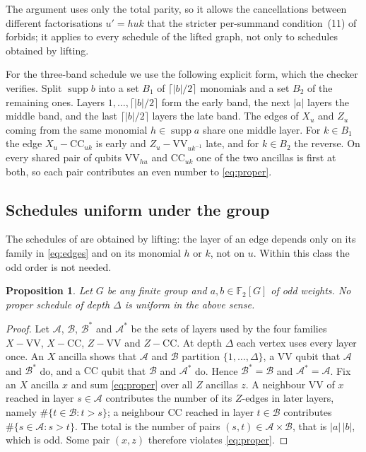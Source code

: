 \documentclass[11pt,a4paper]{article}
\newtheorem{proposition}[theorem]{Proposition}
\theoremstyle{definition}
\theoremstyle{plain}
\newcommand{\F}{\mathbb{F}_2}
\newcommand{\supp}{\operatorname{supp}}
\newcommand{\VV}{\mathrm{VV}}
\newcommand{\CC}{\mathrm{CC}}
\begin{document}
The argument uses only the total parity, so it allows the cancellations
between different factorisations $u'=huk$ that the stricter per-summand
condition~(11) of \cite{NRB2026} forbids; it applies to every schedule of the
lifted graph, not only to schedules obtained by lifting.

For the three-band schedule we use the following explicit form, which the
checker verifies. Split $\supp b$ into a set $B_1$ of $\lceil\lvert b\rvert/2\rceil$
monomials and a set $B_2$ of the remaining ones. Layers
$1,\dots,\lceil\lvert b\rvert/2\rceil$ form the early band, the next
$\lvert a\rvert$ layers the middle band, and the last
$\lceil\lvert b\rvert/2\rceil$ layers the late band. The edges of $X_u$ and $Z_u$
coming from the same monomial $h\in\supp a$ share one middle layer. For
$k\in B_1$ the edge $X_u-\CC_{uk}$ is early and $Z_u-\VV_{uk^{-1}}$ late, and for
$k\in B_2$ the reverse. On every shared pair of qubits $\VV_{hu}$ and
$\CC_{uk}$ one of the two ancillas is first at both, so each pair contributes
an even number to \eqref{eq:proper}.

\subsection{Schedules uniform under the group}
The schedules of \cite{NRB2026} are obtained by lifting: the layer of an edge
depends only on its family in \eqref{eq:edges} and on its monomial $h$ or $k$,
not on $u$. Within this class the odd order is not needed.

\begin{proposition}\label{prop:uniform}
Let $G$ be any finite group and $a,b\in\F[G]$ of odd weights. No proper
schedule of depth $\Delta$ is uniform in the above sense.
\end{proposition}
\begin{proof}
Let $\mathcal A$, $\mathcal B$, $\mathcal B^*$ and $\mathcal A^*$ be the sets
of layers used by the four families $X-\VV$, $X-\CC$, $Z-\VV$ and $Z-\CC$. At
depth $\Delta$ each vertex uses every layer once. An $X$ ancilla shows that
$\mathcal A$ and $\mathcal B$ partition $\{1,\dots,\Delta\}$, a $\VV$ qubit that
$\mathcal A$ and $\mathcal B^*$ do, and a $\CC$ qubit that $\mathcal B$ and
$\mathcal A^*$ do. Hence $\mathcal B^*=\mathcal B$ and $\mathcal A^*=\mathcal A$.
Fix an $X$ ancilla $x$ and sum \eqref{eq:proper} over all $Z$ ancillas $z$. A
neighbour $\VV$ of $x$ reached in layer $s\in\mathcal A$ contributes the
number of its $Z$-edges in later layers, namely
$\#\{t\in\mathcal B: t>s\}$; a neighbour $\CC$ reached in layer $t\in\mathcal B$
contributes $\#\{s\in\mathcal A: s>t\}$. The total is the number of pairs
$(s,t)\in\mathcal A\times\mathcal B$, that is $\lvert a\rvert\,\lvert b\rvert$, which
is odd. Some pair $(x,z)$ therefore violates \eqref{eq:proper}.
\end{proof}
\end{document}
